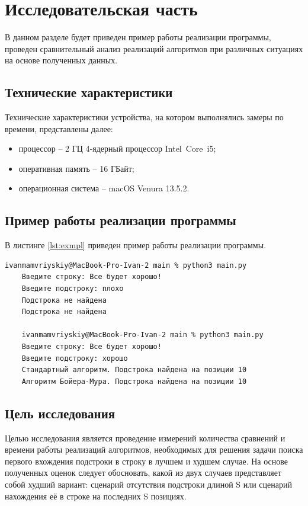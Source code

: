 \chapter{Исследовательская часть}

В данном разделе будет приведен пример работы реализации программы, проведен сравнительный анализ реализаций алгоритмов 
при различных ситуациях на основе полученных данных.

\section{Технические характеристики}

Технические характеристики устройства, на котором выполнялись замеры по времени, представлены далее:

\begin{itemize}
	\item процессор -- 2 ГЦ 4‑ядерный процессор Intel Core i5;
	\item оперативная память -- 16 ГБайт;
	\item операционная система -- macOS Venura 13.5.2. 
\end{itemize}

\section{Пример работы реализации программы}

В листинге \ref{lst:exmpl} приведен пример работы реализации программы.

\begin{lstlisting}[label=lst:exmpl,caption=Демонстрация работы реализации программы]
    ivanmamvriyskiy@MacBook-Pro-Ivan-2 main % python3 main.py
    Введите строку: Все будет хорошо!
    Введите подстроку: плохо
    Подстрока не найдена
    Подстрока не найдена

    ivanmamvriyskiy@MacBook-Pro-Ivan-2 main % python3 main.py
    Введите строку: Все будет хорошо!
    Введите подстроку: хорошо
    Стандартный алгоритм. Подстрока найдена на позиции 10
    Алгоритм Бойера-Мура. Подстрока найдена на позиции 10
\end{lstlisting}

\section{Цель исследования}
Целью исследования является проведение измерений количества сравнений и времени работы реализаций алгоритмов, необходимых для 
решения задачи поиска первого вхождения подстроки в строку в лучшем и худшем случае. 
На основе полученных оценок следует обосновать, какой из двух случаев представляет собой худший 
вариант: сценарий отсутствия подстроки длиной S или сценарий нахождения её в строке на последних S позициях.

